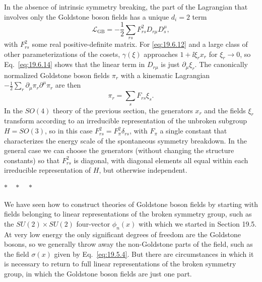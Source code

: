 In the absence of intrinsic symmetry breaking, the part of the Lagrangian that involves only the Goldstone boson fields has a unique $d_i=2$ term
\begin{equation}
\mathcal L_{\mathrm{GB}}
=-\frac{1}{2}\sum_{rs}F^2_{rs}D_{r\mu}D_s^{\mu},
\tag{19.6.46}\label{eq:19.6.46}
\end{equation}
with $F^2_{rs}$ some real positive-definite matrix. For \eqref{eq:19.6.12} and a large class of other parameterizations of the cosets, $\gamma(\xi)$ approaches $1+\ii\xi_rx_r$ for $\xi_r\to0$, so Eq.~\eqref{eq:19.6.14} shows that the linear term in $D_{r\mu}$ is just $\partial_\mu\xi_r$. The canonically normalized Goldstone boson fields $\pi_r$ with a kinematic Lagrangian $-\tfrac12\sum_r\partial_\mu\pi_r\partial^\mu\pi_r$ are then
\begin{equation}
\pi_r=\sum_sF_{rs}\xi_s.
\tag{19.6.47}\label{eq:19.6.47}
\end{equation}
In the $SO(4)$ theory of the previous section, the generators $x_r$ and the fields $\xi_r$ transform according to an irreducible representation of the unbroken subgroup $H=SO(3)$, so in this case $F^2_{rs}=F_\pi^2\delta_{rs}$, with $F_\pi$ a single constant that characterizes the energy scale of the spontaneous symmetry breakdown. In the general case we can choose the generators (without changing the structure constants) so that $F^2_{rs}$ is diagonal, with diagonal elements all equal within each irreducible representation of $H$, but otherwise independent.

\begin{center}
$\ast\quad\ast\quad\ast$
\end{center}

We have seen how to construct theories of Goldstone boson fields by starting with fields belonging to linear representations of the broken symmetry group, such as the $SU(2)\times SU(2)$ four-vector $\phi_n(x)$ with which we started in Section 19.5. At very low energy the only significant degrees of freedom are the Goldstone bosons, so we generally throw away the non-Goldstone parts of the field, such as the field $\sigma(x)$ given by Eq.~\eqref{eq:19.5.4}. But there are circumstances in which it is necessary to return to full linear representations of the broken symmetry group, in which the Goldstone boson fields are just one part.

